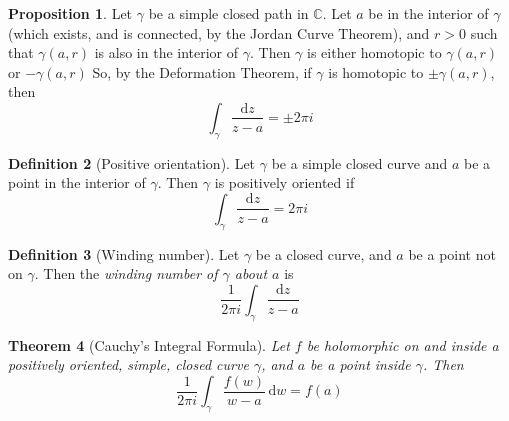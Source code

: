 \documentclass[10pt,fleqn]{article}
\newcommand{\diff}{\,\mathrm{d}}
\newcommand{\comps}{\mathbb{C}}
\theoremstyle{definition} \newtheorem{defn}{Definition}[section]
\theoremstyle{plain}      \newtheorem{thm}[defn]{Theorem}
\theoremstyle{definition} \newtheorem{prop}[defn]{Proposition}
\theoremstyle{plain}      \newtheorem{lem}[defn]{Lemma}
\theoremstyle{definition} \newtheorem{cor}[defn]{Corollary}
\theoremstyle{definition} \newtheorem{ex}[defn]{Example}
\theoremstyle{definition} \newtheorem{rem}[defn]{Remark}
\begin{document}
\begin{prop}
    Let $\gamma$ be a simple closed path in $\comps$.
    Let $a$ be in the interior of $\gamma$ (which exists, and is connected, by the Jordan Curve Theorem), and $r>0$ such that $\gamma(a,r)$ is also in the interior of $\gamma$.
    Then $\gamma$ is either homotopic to $\gamma(a,r)$ or $-\gamma(a,r)$
    So, by the Deformation Theorem, if $\gamma$ is homotopic to $\pm\gamma(a,r)$, then
    \[
        \int_{\gamma}\frac{\mathrm{d}z}{z-a}
        =\pm2\pi i
    \]
\end{prop}

\begin{defn}[Positive orientation]\label{positive-orientation}
    Let $\gamma$ be a simple closed curve and $a$ be a point in the interior of $\gamma$.
    Then $\gamma$ is positively oriented if
    \begin{equation}
        \int_{\gamma}\frac{\mathrm{d}z}{z-a}=
        2\pi i
    \end{equation}
\end{defn}

\begin{defn}[Winding number]
    Let $\gamma$ be a closed curve, and $a$ be a point not on $\gamma$.
    Then the \emph{winding number of $\gamma$ about $a$} is
    \begin{equation}
        \frac{1}{2\pi i}\int_{\gamma}\frac{\mathrm{d}z}{z-a}
    \end{equation}
\end{defn}

\begin{thm}[Cauchy's Integral Formula]
    Let $f$ be holomorphic on and inside a positively oriented, simple, closed curve $\gamma$, and $a$ be a point inside $\gamma$.
    Then
    \begin{equation}
        \frac{1}{2\pi i}\int_{\gamma}\frac{f(w)}{w-a}\diff w=
        f(a)
    \end{equation}
\end{thm}
\end{document}
